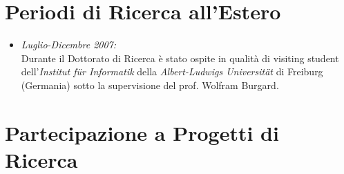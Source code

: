 \documentclass[11pt]{article}
\newcommand{\ITEMDATE}[1]{\item \textit{#1:}\\}
\begin{document}

\section*{Periodi di Ricerca all'Estero}

\begin{itemize}

\ITEMDATE{Luglio-Dicembre 2007} 
Durante il Dottorato di Ricerca \`e stato ospite in qualit\`a di visiting student 
dell'\textit{Institut f\"ur Informatik} della \textit{Albert-Ludwigs Universit\"at} 
di Freiburg (Germania) sotto la supervisione del prof. Wolfram Burgard.

\end{itemize}


\section*{Partecipazione a Progetti di Ricerca}
\end{document}
